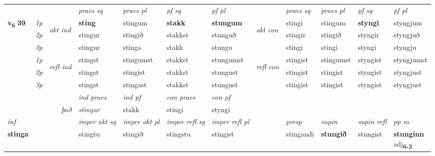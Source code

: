 \begin{longtable}[l]{X>{\footnotesize\itshape}llXXXXlXXXX}
 & &   & \textit{praes sg}  & \textit{praes pl}    & \textit{ pf sg} & \textit{pf pl} & & \textit{praes sg}  & \textit{praes pl}    & \textit{pf sg} & \textit{pf pl }  \\ \cmidrule{4-7} \cmidrule{9-12}
 \multirow{2}{*}{{{\textbf{v{\textsubscript{6}}} \Large{\textbf{39}}}}}  & 1p & \multirow{3}{*}{\begin{turn}{90}\textit{akt ind}\end{turn}} & \textbf{sting} & stingum & \textbf{stakk} & \textbf{stungum} & \multirow{3}{*}{\begin{turn}{90}\textit{akt con}\end{turn}} &stingi & stingum & \textbf{styngi} & styngjum\\*
 & 2p &  &  stingur  & stingið & stakkst & stunguð & & stingir & stingið & styngir & styngjuð \\*
 & 3p &  & stingur & stinga & stakk & stungu & & stingi & stingi& styngi & styngju \\*
\cmidrule{4-7} \cmidrule{9-12}
 & 1p & \multirow{3}{*}{\begin{turn}{90}\textit{refl ind}\end{turn}}  & stingst & stingumst & stakkst & stungumst & \multirow{3}{*}{\begin{turn}{90}\textit{refl con}\end{turn}}  &stingist & stingumst & styngist & styngjumst \\*
 & 2p &  & stingst & stingist & stakkst & stungust & &stingist & stingist & styngist & styngjust \\*
 & 3p  & & stingst & stingast & stakkst & stungust & & stingist & stingist& styngist & styngjust \\*
\cmidrule{4-7} \cmidrule{9-12}

   && &  \textit{ind praes} & \textit{ind pf} & \textit{con praes} & \textit{con pf} \\*
\multicolumn{3}{r}{\textit{það}} & stingur & stakk & stingi & styngi \\*

\cmidrule{4-7}
   {\textit{inf}} & &  & \textit{imper akt sg} & \textit{imper akt pl} & \textit{imper refl sg} & \textit{imper refl pl} && \textit{presp} & \textit{supin} & \textit{supin refl} & \textit{pp m} \\*
  {\textbf{stinga}} & && stingtu  & stingið & stingstu & stingist && stingandi &  \textbf{stungið} & stungist & \specialcell{\textbf{stunginn} \\ adj\textbf{\textsubscript{6-2}}} \\*


\end{longtable}
